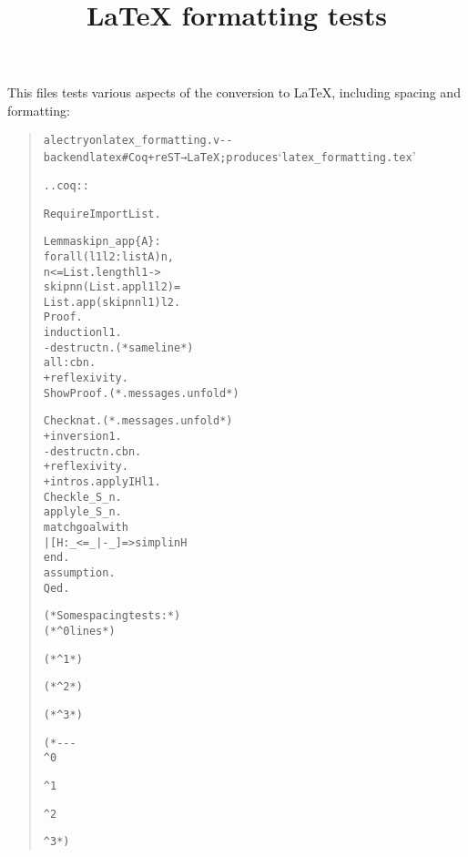 \documentclass[a4paper]{article}
\begin{document}
\title{LaTeX formatting tests%
  \label{latex-formatting-tests}}
\author{}
\date{}
\maketitle

This files tests various aspects of the conversion to LaTeX, including spacing and formatting:

\begin{quote}
\begin{alltt}
alectryon latex_formatting.v -{}-backend latex # Coq+reST → LaTeX; produces ‘latex_formatting.tex’

.. coq::

   Require Import List.

   Lemma skipn_app \{A\}:
     forall (l1 l2: list A) n,
       n <= List.length l1 ->
       skipn n (List.app l1 l2) =
       List.app (skipn n l1) l2.
   Proof.
     induction l1.
     - destruct n. (* same line *)
       all: cbn.
       + reflexivity.
         Show Proof. (* .messages .unfold *)

         Check nat. (* .messages .unfold *)
       + inversion 1.
     - destruct n. cbn.
       + reflexivity.
       + intros. apply IHl1.
         Check le_S_n.
         apply le_S_n.
         match goal with
         | [ H: _ <= _ |- _ ] => simpl in H
         end.
         assumption.
   Qed.

   (* Some spacing tests: *)
   (* ^ 0 lines *)

   (* ^ 1 *)


   (* ^ 2 *)



   (* ^ 3 *)

   (* -{}-{}-
      ^ 0

      ^ 1


      ^ 2



      ^ 3 *)
\end{alltt}
\end{quote}
\end{document}
